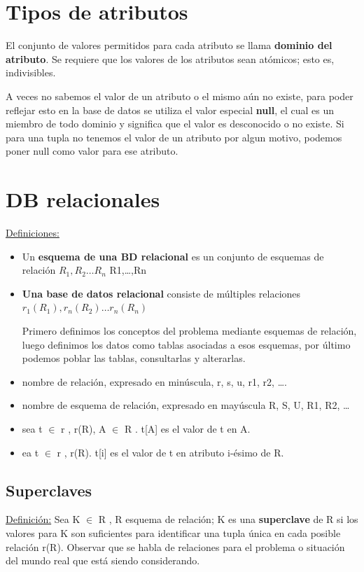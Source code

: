 \documentclass[12pt,a4paper]{report}
\begin{document}
	\section{Tipos de atributos}
		\par El conjunto de valores permitidos para cada atributo se llama \textbf{dominio del atributo}. Se requiere que los valores de los atributos sean atómicos; esto es, indivisibles.

		\par A veces no sabemos el valor de un atributo o el mismo aún no existe, para poder reflejar esto en la base de datos se utiliza el valor especial \textbf{null}, el cual es un miembro de todo dominio y significa que el valor es desconocido o no existe. Si para una tupla no tenemos el valor de un atributo por algun motivo, podemos poner null como valor para ese atributo.
	
	\section{DB relacionales}
		\underline{Definiciones:}
		\begin{itemize}
			\item Un \textbf{esquema de una BD relacional} es un conjunto de esquemas de relación $R_{1}, R_{2} \dotsc R_{n}$
R1,…,Rn
			\item \textbf{Una base de datos relacional} consiste de múltiples relaciones $r_{1}(R_{1}), r_{n}(R_{2}) \dotsc r_{n}(R_{n})$
			\par Primero definimos los conceptos del problema mediante esquemas de relación, luego definimos los datos como tablas asociadas a esos esquemas, por último podemos poblar las tablas, consultarlas y alterarlas.
			\item nombre de relación, expresado en minúscula, r, s, u, r1, r2, ….
			\item nombre de esquema de relación, expresado en mayúscula R, S, U, R1, R2, …
			\item sea t $\in$ r , r(R), A $\in$ R . t[A] es el valor de t en A.
			\item ea t $\in$ r , r(R). t[i] es el valor de t en atributo i-ésimo de R.
		\end{itemize}

		\subsection{Superclaves}
			\underline{Definición:} Sea K $\in$ R , R esquema de relación; K es una \textbf{superclave} de R si los valores para K son suficientes para identificar una tupla única en cada posible relación r(R). Observar que se habla de relaciones para el problema o situación del mundo real que está siendo considerando.
		
\end{document}
